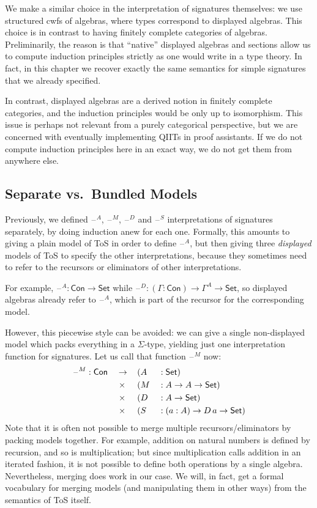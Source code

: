 \documentclass[12pt,a4paper,twoside,openany]{book}
\theoremstyle{remark}
\theoremstyle{definition}
\theoremstyle{theorem}
\newcommand{\Con}{\mathsf{Con}}
\newcommand{\blank}{\mathord{\hspace{1pt}\text{--}\hspace{1pt}}}
\newcommand{\Set}{\mathsf{Set}}
\begin{document}
We make a similar choice in the interpretation of signatures themselves: we use
structured cwfs of algebras, where types correspond to displayed algebras. This
choice is in contrast to having finitely complete categories of algebras.
Preliminarily, the reason is that ``native'' displayed algebras and sections
allow us to compute induction principles strictly as one would write in a type
theory. In fact, in this chapter we recover exactly the same semantics for
simple signatures that we already specified.

In contrast, displayed algebras are a derived notion in finitely complete
categories, and the induction principles would be only up to isomorphism.  This
issue is perhaps not relevant from a purely categorical perspective, but we are
concerned with eventually implementing QIITs in proof assistants. If we do not
compute induction principles here in an exact way, we do not get them from
anywhere else.

\subsection{Separate vs.\ Bundled Models}

Previously, we defined $\blank^A$, $\blank^M$, $\blank^D$ and $\blank^S$
interpretations of signatures separately, by doing induction anew for each
one. Formally, this amounts to giving a plain model of ToS in order to define
$\blank^A$, but then giving three \emph{displayed} models of ToS to specify the
other interpretations, because they sometimes need to refer to the recursors or
eliminators of other interpretations.

For example, $\blank^A : \Con \to \Set$ while $\blank^D : (\Gamma : \Con) \to
\Gamma^A \to \Set$, so displayed algebras already refer to $\blank^A$, which is
part of the recursor for the corresponding model.

However, this piecewise style can be avoided: we can give a single non-displayed
model which packs everything in a $\Sigma$-type, yielding just one
interpretation function for signatures. Let us call that function $\blank^M$ now:
\begin{alignat*}{5}
  & \blank^M : \Con &&\to \,&&(A &&: \Set)\\
  & &&\hspace{0.3em}\times &&(M  &&: A \to A \to \Set)\\
  & &&\hspace{0.3em}\times &&(D  &&: A \to \Set)\\
  & &&\hspace{0.3em}\times &&(S  &&: (a : A) \to D\,a \to \Set)
\end{alignat*}
Note that it is often not possible to merge multiple recursors/eliminators by
packing models together. For example, addition on natural numbers is defined by
recursion, and so is multiplication; but since multiplication calls addition in
an iterated fashion, it is not possible to define both operations by a single
algebra. Nevertheless, merging does work in our case. We will, in fact, get a
formal vocabulary for merging models (and manipulating them in other ways) from
the semantics of ToS itself.
\end{document}
